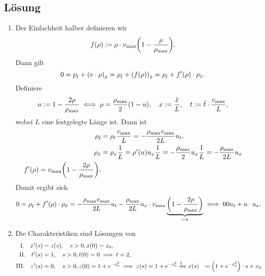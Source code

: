 \documentclass{exercise}
\begin{document}
    \subsection*{Lösung}
    \begin{enumerate}
        \item Der Einfachheit halber definieren wir
        \[
            f\parentheses*{\rho} := \rho \cdot v_{\text{max}}\parentheses*{1 - \frac{\rho}{\rho_{\text{max}}}}.
        \]
        Dann gilt
        \[
            0 = p_{\hat{t}} + \parentheses*{v \cdot \rho}_{\hat{x}} = \rho_{\hat{t}} + \parentheses*{f\parentheses*{\rho}}_{\hat{x}} = \rho_{\hat{t}} + f'\parentheses*{\rho} \cdot \rho_{\hat{x}}.
        \]
        Definiere
        \[
            u := 1 - \frac{2\rho}{\rho_{\text{max}}} \iff \rho = \frac{\rho_{\text{max}}}{2}\parentheses*{1 - u}, \quad x := \frac{\hat{x}}{L}, \quad t := \hat{t} \cdot \frac{v_{\text{max}}}{L},
        \]
        wobei \(L\) eine festgelegte Länge ist.
        Dann ist
        \begin{align*}
            \rho_{\hat{t}} &= \rho_t \frac{v_{\text{max}}}{L} = -\frac{\rho_{\text{max}}v_{\text{max}}}{2L}u_t,\\
            \rho_{\hat{x}} &= \rho_x \frac{1}{L} = \rho'\parentheses*{u}u_x \frac{1}{L} = -\frac{\rho_{\text{max}}}{2}u_x \frac{1}{L} = -\frac{\rho_{\text{max}}}{2L}u_x\\
            f'\parentheses*{\rho} = v_{\text{max}}\parentheses*{1 - \frac{2\rho}{\rho_{\text{max}}}}.
        \end{align*}
        Damit ergibt sich
        \[
            0 = \rho_{\hat{t}} + f'\parentheses*{\rho} \cdot \rho_{\hat{x}} = -\frac{\rho_{\text{max}}v_{\text{max}}}{2L}u_t - \frac{\rho_{\text{max}}}{2L}u_x \cdot v_{\text{max}}\underbrace{\parentheses*{1 - \frac{2\rho}{\rho_{\text{max}}}}}_{= u} \iff 0 0 u_t + u \cdot u_x.
        \]
        \item Die Charakteristiken sind Lösungen von
        \begin{align*}
            \text{I.} \quad x'\parentheses*{s} &= z\parentheses*{s}, \quad s > 0, x\parentheses*{0} = x_0,\\
            \text{II.} \quad t'\parentheses*{s} &= 1, \quad s > 0, t\parentheses*{0} = 0 \implies t = 2,\\
            \text{III.} \quad z'\parentheses*{s} &= 0, \quad s > 0, z\parentheses*{0} = 1 + e^{-x_0^2} \implies z\parentheses*{s} = 1 + e^{-x_0^2}
            \xRightarrow{\text{I.}} x\parentheses*{s} &= \parentheses*{1 + e^{-x_0^2}} \cdot s + x_0\\

\end{align*}
\end{enumerate}
\end{document}
